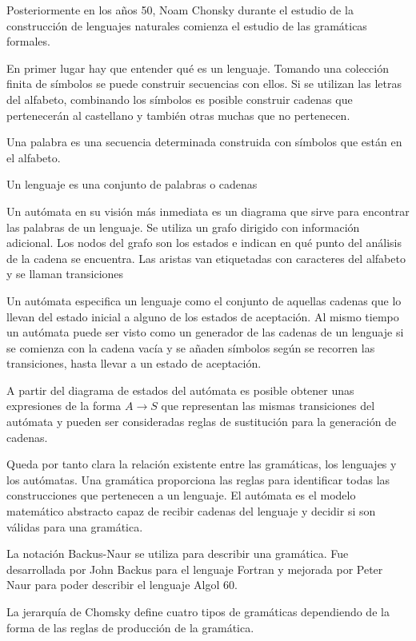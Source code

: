 Posteriormente en los años 50, Noam Chonsky durante el estudio de la construcción de lenguajes naturales comienza el estudio de las gramáticas formales.

En primer lugar hay que entender qué es un lenguaje. Tomando una colección finita de símbolos se puede construir secuencias con ellos. Si se utilizan las letras del alfabeto, combinando los símbolos es posible construir cadenas que pertenecerán al castellano y también otras muchas que no pertenecen.

Una palabra es una secuencia determinada construida con símbolos que están en el alfabeto.

Un lenguaje es una conjunto de palabras o cadenas

Un autómata en su visión más inmediata es un diagrama que sirve para encontrar las palabras de un lenguaje. Se utiliza un grafo dirigido con información adicional. Los nodos del grafo son los estados e indican en qué punto del análisis de la cadena se encuentra. Las aristas van etiquetadas con caracteres del alfabeto y se llaman transiciones

Un autómata especifica un lenguaje como el conjunto de aquellas cadenas que lo llevan del estado inicial a alguno de los estados de aceptación. Al mismo tiempo un autómata puede ser visto como un generador de las cadenas de un lenguaje si se comienza con la cadena vacía y se añaden símbolos según se recorren las transiciones, hasta llevar a un estado de aceptación.

A partir del diagrama de estados del autómata es posible obtener unas expresiones de la forma $A\rightarrow S$ que representan las mismas transiciones del autómata y pueden ser consideradas reglas de sustitución para la generación de cadenas.

Queda por tanto clara la relación existente entre las gramáticas, los lenguajes y los autómatas. Una gramática proporciona las reglas para identificar todas las construcciones que pertenecen a un lenguaje. El autómata es el modelo matemático abstracto capaz de recibir cadenas del lenguaje y decidir si son válidas para una gramática.

La notación Backus-Naur se utiliza para describir una gramática. Fue desarrollada por John Backus para el lenguaje Fortran y mejorada por Peter Naur para poder describir el lenguaje Algol 60.

La jerarquía de Chomsky define cuatro tipos de gramáticas dependiendo de la forma de las reglas de producción de la gramática.

